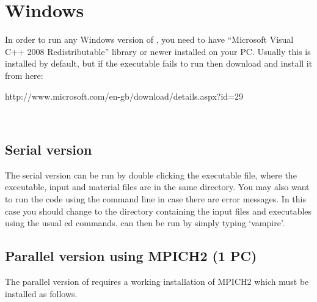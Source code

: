 \section*{Windows}
In order to run any Windows version of \vampire, you need to have ``Microsoft Visual C++ 2008 Redistributable'' library or newer installed on your PC. Usually this is installed by default, but if the executable fails to run then download and install it from here:\\

\begin{minipage}[c]{\textwidth}
\centering
http://www.microsoft.com/en-gb/download/details.aspx?id=29
\end{minipage}\\

\subsection*{Serial version}
The serial version can be run by double clicking the executable file, where the executable, input and material files are in the same directory. You may also want to run the code using the command line in case there are error messages. In this case you should change to the directory containing the input files and executables using the usual cd commands. \vampire can then be run by simply typing `vampire'. 

\subsection*{Parallel version using MPICH2 (1 PC)}
The parallel version of \vampire requires a working installation of MPICH2 which must be installed as follows.

